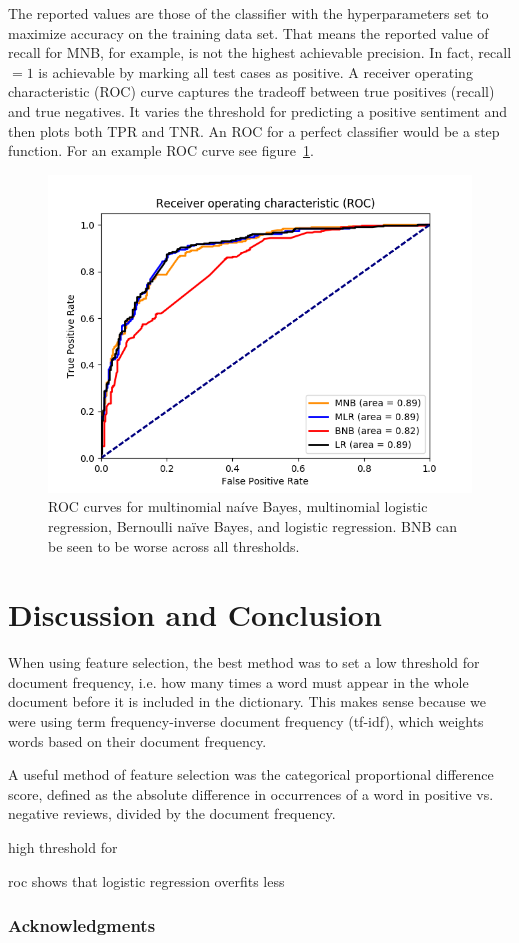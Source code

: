 \documentclass{article} %
\begin{document}
	The reported values are those of the classifier with the hyperparameters set to maximize accuracy on the training data set. That means the reported value of recall for MNB, for example, is not the highest achievable precision. In fact, recall $=1$ is achievable by marking all test cases as positive. A receiver operating characteristic (ROC) curve captures the tradeoff between true positives (recall) and true negatives. It varies the threshold for predicting a positive sentiment and then plots both TPR and TNR. An ROC for a perfect classifier would be a step function. For an example ROC curve see figure~\ref{fig:roc}.
	\begin{figure}[h]
		\centering
		\includegraphics[scale=.5]{ROC}
		\caption{ROC curves for multinomial na\'ive Bayes, multinomial logistic regression, Bernoulli na\"ive Bayes, and logistic regression. BNB can be seen to be worse across all thresholds.}
		\label{fig:roc}
	\end{figure}
		
	\section{Discussion and Conclusion}
	
	When using feature selection, the best method was to set a low threshold for document frequency, i.e. how many times a word must appear in the whole document before it is included in the dictionary. This makes sense because we were using term frequency-inverse document frequency (tf-idf), which weights words based on their document frequency. 
	
	A useful method of feature selection was the categorical proportional difference score, defined as the absolute difference in occurrences of a word in positive vs. negative reviews, divided by the document frequency. 
	
	high threshold for 
	
	roc shows that logistic regression overfits less
	
	\subsubsection*{Acknowledgments}
	
	
	
	
	
\end{document}
